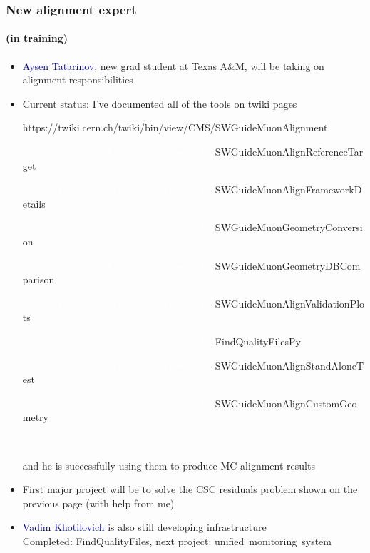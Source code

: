 \documentclass[compress]{beamer}
\begin{document}
\begin{frame}
\frametitle{New alignment expert}
\framesubtitle{(in training)}

\begin{itemize}
\item \textcolor{darkblue}{Aysen Tatarinov}, new grad student at Texas A\&M, will be taking on alignment responsibilities

\item Current status: I've documented all of the tools on twiki pages

{\tiny https://twiki.cern.ch/twiki/bin/view/CMS/SWGuideMuonAlignment

\textcolor{white}{https://twiki.cern.ch/twiki/bin/view/CMS/}SWGuideMuonAlignReferenceTarget

\textcolor{white}{https://twiki.cern.ch/twiki/bin/view/CMS/}SWGuideMuonAlignFrameworkDetails

\textcolor{white}{https://twiki.cern.ch/twiki/bin/view/CMS/}SWGuideMuonGeometryConversion

\textcolor{white}{https://twiki.cern.ch/twiki/bin/view/CMS/}SWGuideMuonGeometryDBComparison

\textcolor{white}{https://twiki.cern.ch/twiki/bin/view/CMS/}SWGuideMuonAlignValidationPlots

\textcolor{white}{https://twiki.cern.ch/twiki/bin/view/CMS/}FindQualityFilesPy

\textcolor{white}{https://twiki.cern.ch/twiki/bin/view/CMS/}SWGuideMuonAlignStandAloneTest

\textcolor{white}{https://twiki.cern.ch/twiki/bin/view/CMS/}SWGuideMuonAlignCustomGeometry

\mbox{ }}

\vspace{-0.5 cm}
and he is successfully using them to produce MC alignment results

\item First major project will be to solve the CSC residuals problem shown on the previous page (with help from me)

\item \textcolor{darkblue}{Vadim Khotilovich} is also still developing infrastructure \\ Completed: FindQualityFiles, next project: \mbox{unified monitoring system\hspace{-1 cm}}
\end{itemize}
\end{frame}
\end{document}
